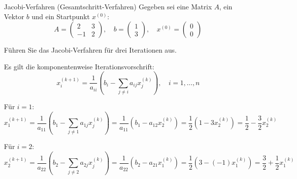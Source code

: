 \begin{example}{Jacobi-Verfahren (Gesamtschritt-Verfahren)}
    Gegeben sei eine Matrix $A$, ein Vektor $b$ und ein Startpunkt $x^{(0)}$:
    \[
        A = \begin{pmatrix}
            2  & 3 \\
            -1 & 2
        \end{pmatrix}
        , \quad
        b = \begin{pmatrix}
            1 \\
            3
        \end{pmatrix}
        , \quad
        x^{(0)} = \begin{pmatrix}
            0 \\
            0
        \end{pmatrix}
    \]

    Führen Sie das Jacobi-Verfahren für drei Iterationen aus.

    \exampleseparator

    Es gilt die komponentenweise Iterationsvorschrift:
    \[
        x_i^{(k+1)} = \frac{1}{a_{ii}} \left( b_i - \sum_{j \neq i} a_{ij} x_j^{(k)} \right), \quad i = 1, \ldots, n
    \]

    Für $i = 1$:
    \[
        x_1^{(k+1)} = \frac{1}{a_{11}} \left( b_1 - \sum_{j \neq 1} a_{1j} x_j^{(k)} \right) = \frac{1}{a_{11}} \left( b_1 - a_{12} x_2^{(k)} \right) = \frac{1}{2} \left( 1 - 3 x_2^{(k)} \right) = \frac{1}{2} - \frac{3}{2}x_2^{(k)}
    \]

    Für $i = 2$:
    \[
        x_2^{(k+1)} = \frac{1}{a_{22}} \left( b_2 - \sum_{j \neq 2} a_{2j} x_j^{(k)} \right) = \frac{1}{a_{22}} \left( b_2 - a_{21} x_1^{(k)} \right) = \frac{1}{2} \left( 3 - (-1) x_1^{(k)} \right) = \frac{3}{2} + \frac{1}{2}x_1^{(k)}
    \]


\end{example}
